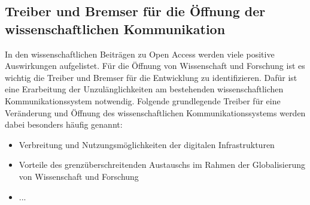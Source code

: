\subsection{Treiber und Bremser für die Öffnung der wissenschaftlichen Kommunikation}

In den wissenschaftlichen Beiträgen zu Open Access werden viele positive Auswirkungen aufgelistet. Für die Öffnung von Wissenschaft und Forschung ist es wichtig die Treiber und Bremser für die Entwicklung zu identifizieren. Dafür ist eine Erarbeitung der Unzulänglichkeiten am bestehenden wissenschaftlichen Kommunikationssystem notwendig\cite{cite:17}. Folgende grundlegende Treiber für eine Veränderung und Öffnung des wissenschaftlichen Kommunikationssystems werden dabei besonders häufig genannt:

\begin{itemize}
\item Verbreitung und Nutzungsmöglichkeiten der digitalen Infrastrukturen
\item Vorteile des grenzüberschreitenden Austauschs im Rahmen der Globalisierung von Wissenschaft und Forschung
\item ...
\end{itemize}

